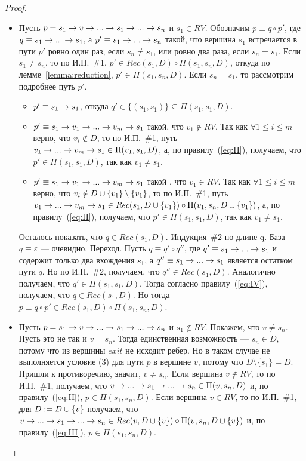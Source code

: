 \begin{defn}
\begin{proof}
\begin{itemize}
    \item Пусть $p = s_1 \rightarrow v \rightarrow ... \rightarrow s_1 \rightarrow ... \rightarrow s_n$ и $s_1 \in RV$.
          Обозначим $p \equiv q \circ p'$, где $q \equiv s_1 \rightarrow ... \rightarrow s_1$, а
          $p' \equiv s_1 \rightarrow ... \rightarrow s_n$ такой, что вершина $s_1$ встречается в пути $p'$ ровно один раз, если $s_n \neq s_1$, или ровно два раза, если $s_n = s_1$. Если $s_1 \neq s_n$, то по И.П.~\#1, $p' \in Rec(s_1,D) \circ \Pi(s_1,s_n,D)$, откуда по лемме~\ref{lemma:reduction},
          $p' \in \Pi(s_1,s_n,D)$. Если $s_n = s_1$, то рассмотрим подробнее путь $p'$.
          \begin{itemize}
            \item $p' \equiv s_1 \rightarrow s_1$, откуда $q' \in \{(s_1,s_1)\} \subseteq \Pi(s_1,s_1,D)$.
            \item $p' \equiv s_1 \rightarrow v_1 \rightarrow ... \rightarrow v_m \rightarrow s_1$ такой, что $v_1 \notin RV$.
                  Так как $\forall 1 \leq i \leq m$ верно, что $v_i \notin D$, то 
                  по И.П.~\#1, путь $v_1 \rightarrow ... \rightarrow v_m \rightarrow s_1 \in \Pi(v_1, s_1, D)$, а, по правилу~(\ref{eq:II}), получаем, что
                  $p' \in \Pi(s_1,s_1,D)$, так как $v_1 \neq s_1$.
            \item $p' \equiv s_1 \rightarrow v_1 \rightarrow ... \rightarrow v_m \rightarrow s_1$ такой , что $v_1 \in RV$.
                Так как $\forall 1 \leq i \leq m$ верно, что $v_i \notin D \cup \{v_1\} \setminus \{v_1\}$, то 
                по И.П.~\#1, путь $v_1 \rightarrow ... \rightarrow v_m \rightarrow s_1 \in Rec(s_1,D \cup \{v_1\}) \circ \Pi(v_1,s_n,D \cup \{v_1\})$,
                а, по правилу~(\ref{eq:II}), получаем, что $p' \in \Pi(s_1,s_1,D)$, так как $v_1 \neq s_1$.
        \end{itemize}
        Осталось показать, что $q \in Rec(s_1,D)$.
        Индукция~\#2 по длине q. База $q \equiv \varepsilon$ --- очевидно.
        Переход. Пусть $q \equiv q' \circ q''$, где $q' \equiv s_1 \rightarrow ... \rightarrow s_1$ и содержит только два вхождения $s_1$, 
        а $q'' \equiv s_1 \rightarrow ... \rightarrow s_1$ является остатком пути $q$.
        Но по И.П.~\#2, получаем, что $q'' \in Rec(s_1, D)$. 
        Аналогично получаем, что $q' \in \Pi(s_1,s_1,D)$. Тогда согласно правилу~(\ref{eq:IV}), получаем, что $q \in Rec(s_1,D)$.
        Но тогда $p \equiv q \circ p' \in Rec(s_1,D) \circ \Pi(s_1,s_n,D)$.
    \item Пусть $p = s_1 \rightarrow v \rightarrow ... \rightarrow s_1 \rightarrow ... \rightarrow s_n$ и $s_1 \notin RV$. Покажем, что $v \neq s_n$.
    Пусть это не так и $v = s_n$. Тогда единственная возможность --- $s_n \in D$, потому что из вершины $exit$ не исходит ребер.
    Но в таком случае не выполняется условие (3) для пути $p$ в вершине $v$, потому что $D \setminus \{s_1\} = D$. Пришли к противоречию, значит, $v \neq s_n$.
        Если вершина $v \notin RV$, то по И.П.~\#1, получаем, что $v \rightarrow ... \rightarrow s_1 \rightarrow ... \rightarrow s_n \in \Pi(v,s_n,D)$ и, по правилу~(\ref{eq:II}),
        $p \in \Pi(s_1, s_n, D)$.
        Если вершина $v \in RV$, то по И.П.~\#1, для $D := D \cup \{v\}$ получаем, что $v \rightarrow ... \rightarrow s_1 \rightarrow ... \rightarrow s_n \in Rec(v, D \cup \{v\}) \circ \Pi(v,s_n,D \cup \{v\})$ и, по правилу~(\ref{eq:III}), $p \in \Pi(s_1,s_n,D)$.
\end{itemize}
\end{proof}


\end{defn}
